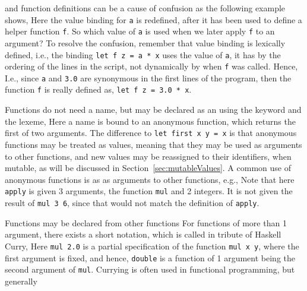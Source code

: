  and function definitions can be a cause of confusion as the following example shows,
%
%
Here the value binding for \lstinline!a! is redefined, after it has been used to define a helper function \lstinline!f!. So which value of \lstinline!a! is used when we later apply \lstinline!f! to an argument? To resolve the confusion, remember that value binding is lexically defined, i.e., the binding \lstinline!let f z = a * x! uses the value of \lstinline!a!, it has by the ordering of the lines in the script, not dynamically by when \lstinline!f! was called. Hence,  I.e., since \lstinline!a! and \lstinline!3.0! are synonymous in the first lines of the program, then the function \lstinline!f! is really defined as, \lstinline!let f z = 3.0 * x!. 

Functions do not need a name, but may be declared as an  using the  keyword and the \lexeme{->} lexeme,
%
%
Here a name is bound to an anonymous function, which returns the first of two arguments. The difference to \lstinline!let first x y = x! is that anonymous functions may be treated as values, meaning that they may be used as arguments to other functions, and new values may be reassigned to their identifiers, when mutable, as will be discussed in Section~\ref{sec:mutableValues}. A common use of anonymous functions is as as arguments to other functions, e.g.,
%
%
Note that here \lstinline!apply! is given 3 arguments, the function \lstinline!mul! and 2 integers. It is not given the result of \lstinline!mul 3 6!, since that would not match the definition of \lstinline!apply!. 

Functions may be declared from other functions
For functions of more than 1 argument, there exists a short notation, which is called  in tribute of Haskell Curry,
%
%
Here \lstinline{mul 2.0} is a partial specification of the function \lstinline{mul x y}, where the first argument is fixed, and hence, \lstinline{double} is a function of 1 argument being the second argument of \lstinline{mul}. Currying is often used in functional programming, but generally 

